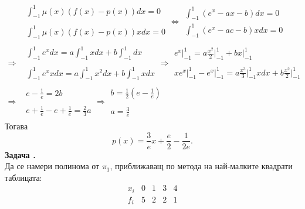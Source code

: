 \documentclass[12pt]{article}
\newcounter{problem}
\newcommand\problem{%
  \stepcounter{problem}%
  \textbf{Задача \theproblem.}~%
  \\
}
\begin{document}
        \begin{align*}
        &\begin{array}{|c}
        \int_{-1}^{1}\mu(x)(f(x)-p(x))dx = 0\\
        \\
        \int_{-1}^{1}\mu(x)(f(x)-p(x))xdx = 0
        \end{array}
        \Leftrightarrow
        \begin{array}{|c}
        \int_{-1}^{1}(e^x-ax - b)dx = 0\\
        \int_{-1}^{1}(e^x -ac - b)xdx = 0 
        \end{array}\\
        \Rightarrow
        &\begin{array}{|c}
        \int_{-1}^{1}e^xdx = a\int_{-1}^{1}xdx+b\int_{-1}^{1}dx\\
        \\
        \int_{-1}^{1}e^xxdx = a\int_{-1}^{1}x^2dx+b\int_{-1}^{1}xdx
        \end{array}
        \Rightarrow
        \begin{array}{|c}
        e^x\rvert_{-1}^{1} = a\frac{x^2}{2}\rvert_{-1}^{1}+bx\rvert_{-1}^{1}\\
        \\
        xe^x\rvert_{-1}^{1} - e^x\rvert_{-1}^{1} = a\frac{x^3}{3}\rvert_{-1}^{1}xdx+b\frac{x^2}{2}\rvert_{-1}^{1}
        \end{array}\\
        \Rightarrow
        &\begin{array}{|c}
        e-\frac{1}{e}=2b\\
        \\
        e + \frac{1}{e} - e + \frac{1}{e} = \frac{2}{3}a
        \end{array}
        \Rightarrow
        \boxed{\begin{array}{|c}
        b = \frac{1}{2}\left(e-\frac{1}{e}\right)\\
        \\
        a = \frac{3}{e}
        \end{array}}
        \end{align*}
        Тогава
        \begin{equation*}
        \boxed{p(x) = \frac{3}{e}x + \frac{e}{2} - \frac{1}{2e}}.
        \end{equation*}
    \problem
        Да се намери полинома от $\pi_1$, приближаващ по метода на най-малките квадрати таблицата:
        \begin{equation*}
        \begin{array}{c|c|c|c|c|}
        x_i & 0 & 1 & 3 & 4\\
        \hline
        f_i & 5 & 2 & 2 & 1
        \end{array}
        \end{equation*}
\end{document}
